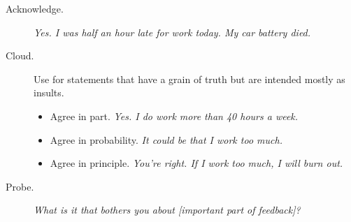 \documentclass{article}
\begin{document}
\begin{tiny}
\begin{multicols}{3}
\begin{tcolorbox}
\begin{description}
            \item[Acknowledge.] \emph{Yes. I was half an hour late for work today. My car battery died.}
            \item[Cloud.] Use for statements that have a grain of truth but are intended mostly as insults.
              \begin{itemize}
                 \item Agree in part. \emph{Yes. I do work more than 40 hours a week.}
                 \item Agree in probability. \emph{It could be that I work too much.}
                 \item Agree in principle. \emph{You're right. If I work too much, I will burn out.}
              \end{itemize}
            \item[Probe.] \emph{What is it that bothers you about [important part of feedback]?}
         \end{description}

    \end{tcolorbox}

    \begin{tcolorbox}[
            enhanced,
            coltitle=black,
            colbacktitle={white},
            colback={white},
            title=Giving Helpful Corrective Feedback,
            colframe=rainbow4
        ]


\end{tcolorbox}
\end{multicols}
\end{tiny}
\end{document}
